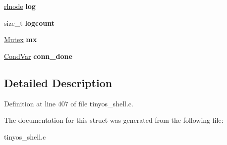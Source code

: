 \begin{DoxyCompactItemize}
\item 
\hyperlink{group__rlists_ga8f6244877f7ce2322c90525217ea6e7a}{rlnode} {\bfseries log}\hypertarget{struct____rs__globals_a8578087e09ae301d77b81dd2b5a661fa}{}\label{struct____rs__globals_a8578087e09ae301d77b81dd2b5a661fa}

\item 
size\+\_\+t {\bfseries logcount}\hypertarget{struct____rs__globals_ad1001e26c768cecab1408d19f025d3f8}{}\label{struct____rs__globals_ad1001e26c768cecab1408d19f025d3f8}

\item 
\hyperlink{group__syscalls_gaef2ec62cae8e0031fd19fc8b91083ade}{Mutex} {\bfseries mx}\hypertarget{struct____rs__globals_ae6f58855b0c5911cacb493a1f305c9e3}{}\label{struct____rs__globals_ae6f58855b0c5911cacb493a1f305c9e3}

\item 
\hyperlink{structCondVar}{Cond\+Var} {\bfseries conn\+\_\+done}\hypertarget{struct____rs__globals_acded897204308c539cab184093cd6207}{}\label{struct____rs__globals_acded897204308c539cab184093cd6207}

\end{DoxyCompactItemize}


\subsection{Detailed Description}


Definition at line 407 of file tinyos\+\_\+shell.\+c.



The documentation for this struct was generated from the following file\+:\begin{DoxyCompactItemize}
\item 
tinyos\+\_\+shell.\+c\end{DoxyCompactItemize}

